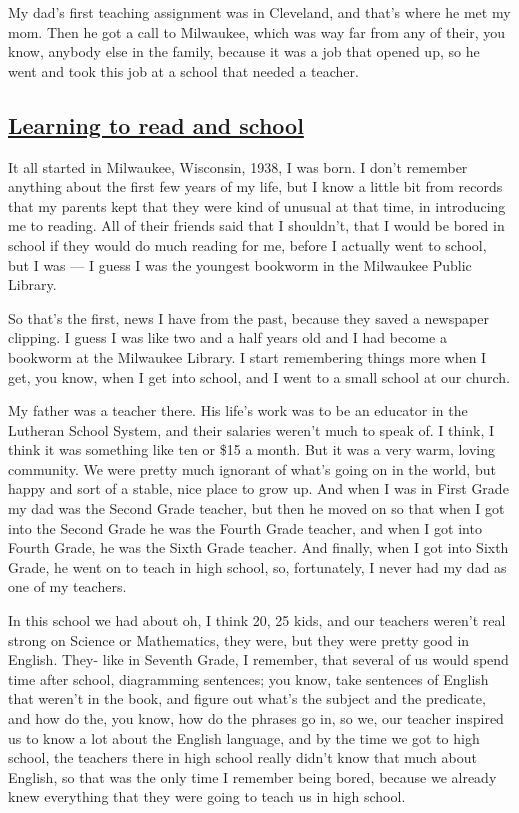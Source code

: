 \documentclass[]{article}
\begin{document}
My dad's first teaching assignment was in Cleveland, and that's where he
met my mom. Then he got a call to Milwaukee, which was way far from any
of their, you know, anybody else in the family, because it was a job
that opened up, so he went and took this job at a school that needed a
teacher.

\subsection{\texorpdfstring{\href{http://webofstories.com/play/17061}{Learning
to read and
school}}{Learning to read and school}}\label{learning-to-read-and-school}

It all started in Milwaukee, Wisconsin, 1938, I was born. I don't
remember anything about the first few years of my life, but I know a
little bit from records that my parents kept that they were kind of
unusual at that time, in introducing me to reading. All of their friends
said that I shouldn't, that I would be bored in school if they would do
much reading for me, before I actually went to school, but I was --- I
guess I was the youngest bookworm in the Milwaukee Public Library.

So that's the first, news I have from the past, because they saved a
newspaper clipping. I guess I was like two and a half years old and I
had become a bookworm at the Milwaukee Library. I start remembering
things more when I get, you know, when I get into school, and I went to
a small school at our church.

My father was a teacher there. His life's work was to be an educator in
the Lutheran School System, and their salaries weren't much to speak of.
I think, I think it was something like ten or \$15 a month. But it was a
very warm, loving community. We were pretty much ignorant of what's
going on in the world, but happy and sort of a stable, nice place to
grow up. And when I was in First Grade my dad was the Second Grade
teacher, but then he moved on so that when I got into the Second Grade
he was the Fourth Grade teacher, and when I got into Fourth Grade, he
was the Sixth Grade teacher. And finally, when I got into Sixth Grade,
he went on to teach in high school, so, fortunately, I never had my dad
as one of my teachers.

In this school we had about oh, I think 20, 25 kids, and our teachers
weren't real strong on Science or Mathematics, they were, but they were
pretty good in English. They- like in Seventh Grade, I remember, that
several of us would spend time after school, diagramming sentences; you
know, take sentences of English that weren't in the book, and figure out
what's the subject and the predicate, and how do the, you know, how do
the phrases go in, so we, our teacher inspired us to know a lot about
the English language, and by the time we got to high school, the
teachers there in high school really didn't know that much about
English, so that was the only time I remember being bored, because we
already knew everything that they were going to teach us in high school.
\end{document}
